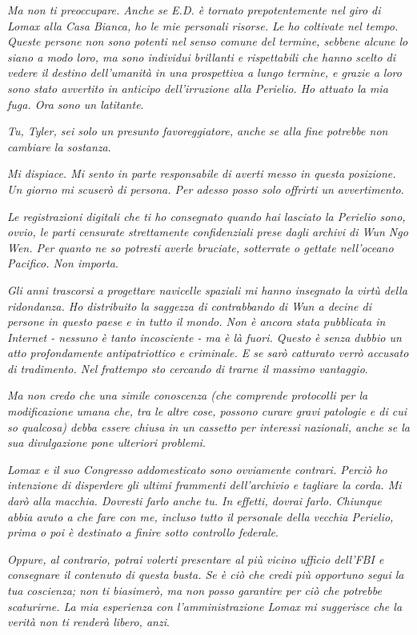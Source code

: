 \emph{Ma non ti preoccupare. Anche se E.D. è tornato prepotentemente nel
	giro di Lomax alla Casa Bianca, ho le mie personali risorse. Le ho
	coltivate nel tempo. Queste persone non sono potenti nel senso comune
	del termine, sebbene alcune lo siano a modo loro, ma sono individui
	brillanti e rispettabili che hanno scelto di vedere il destino
	dell'umanità in una prospettiva a lungo termine, e grazie a loro sono
	stato avvertito in anticipo dell'irruzione alla Perielio. Ho attuato la
	mia fuga. Ora sono un latitante}.

\emph{Tu, Tyler, sei solo un presunto favoreggiatore, anche se alla fine
	potrebbe non cambiare la sostanza}.

\emph{Mi dispiace. Mi sento in parte responsabile di averti messo in
	questa posizione. Un giorno mi scuserò di persona. Per adesso posso solo
	offrirti un avvertimento}.

\emph{Le registrazioni digitali che ti ho consegnato quando hai lasciato
	la Perielio sono, ovvio, le parti censurate strettamente confidenziali
	prese dagli archivi di Wun Ngo Wen. Per quanto ne so potresti averle
	bruciate, sotterrate o gettate nell'oceano Pacifico. Non importa}.

\emph{Gli anni trascorsi a progettare navicelle spaziali mi hanno
	insegnato la virtù della ridondanza. Ho distribuito la saggezza di
	contrabbando di Wun a decine di persone in questo paese e in tutto il
	mondo. Non è ancora stata pubblicata in Internet - nessuno è tanto
	incosciente - ma è là fuori. Questo è senza dubbio un atto profondamente
	antipatriottico e criminale. E se sarò catturato verrò accusato di
	tradimento. Nel frattempo sto cercando di trarne il massimo vantaggio}.

\emph{Ma non credo che una simile conoscenza (che comprende protocolli
	per la modificazione umana che, tra le altre cose, possono curare gravi
	patologie e di cui so qualcosa) debba essere chiusa in un cassetto per
	interessi nazionali, anche se la sua divulgazione pone ulteriori
	problemi}.

\emph{Lomax e il suo Congresso addomesticato sono ovviamente contrari.
	Perciò ho intenzione di disperdere gli ultimi frammenti dell'archivio e
	tagliare la corda. Mi darò alla macchia. Dovresti farlo anche tu. In
	effetti, dovrai farlo. Chiunque abbia avuto a che fare con me, incluso
	tutto il personale della vecchia Perielio, prima o poi è destinato a
	finire sotto controllo federale}.

\emph{Oppure, al contrario, potrai volerti presentare al più vicino
	ufficio dell'FBI e consegnare il contenuto di questa busta. Se è ciò che
	credi più opportuno segui la tua coscienza; non ti biasimerò, ma non
	posso garantire per ciò che potrebbe scaturirne. La mia esperienza con
	l'amministrazione Lomax mi suggerisce che la verità non ti renderà
	libero, anzi}.

